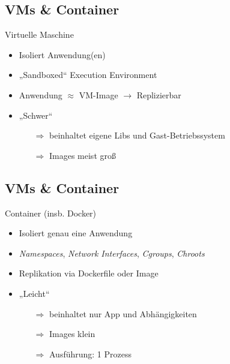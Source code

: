 \documentclass{beamer}
\begin{document}
\subsection{VMs \& Container}
\begin{frame}{\insertsubsection}
	Virtuelle Maschine
	\begin{itemize}
		\setlength\itemsep{1em}
		\item Isoliert Anwendung(en)
		\item „Sandboxed“ Execution Environment
		\item Anwendung $\approx$ VM-Image $\rightarrow$ Replizierbar
		\item „Schwer“
		\begin{itemize}
			\item[$\Rightarrow$] beinhaltet eigene Libs und Gast-Betriebssystem
			\item[$\Rightarrow$] Images meist groß
		\end{itemize}
	\end{itemize}
\end{frame}

\subsection{VMs \& Container}
\begin{frame}{\insertsubsection}
	Container (insb. Docker)
	\begin{itemize}
		\setlength\itemsep{1em}
		\item Isoliert genau eine Anwendung
		\item \textit{Namespaces}, \textit{Network Interfaces}, \textit{Cgroups}, \textit{Chroots}
		\item Replikation via Dockerfile oder Image
		\item „Leicht“
		\begin{itemize}
			\item[$\Rightarrow$] beinhaltet nur App und Abhängigkeiten
			\item[$\Rightarrow$] Images klein
			\item[$\Rightarrow$] Ausführung: 1 Prozess
		\end{itemize}
	\end{itemize}
\end{frame}
\end{document}
